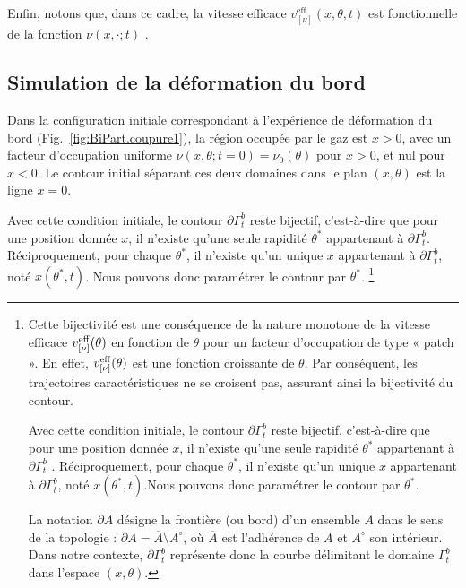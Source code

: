 Enfin, notons que, dans ce cadre, la vitesse efficace $v^{\mathrm{eff}}_{[\nu]}(x,\theta,t)$ est fonctionnelle de la fonction $\nu(x , \cdot ;t )$ . %


\subsection{Simulation de la déformation du bord}


Dans la configuration initiale correspondant à l’expérience de déformation du bord (Fig.~\ref{fig:BiPart.coupure1}), la région occupée par le gaz est $x>0$, avec un facteur d’occupation uniforme \(\nu(x,\theta;t=0)=\nu_0(\theta)\) pour \(x>0\), et nul pour \(x<0\). Le contour initial séparant ces deux domaines dans le plan \((x,\theta)\) est la ligne $x=0$.

\medskip

Avec cette condition initiale, le contour \(\partial\Gamma_t^b\) reste bijectif, c’est-à-dire que pour une position donnée $x$, il n’existe qu’une seule rapidité \(\theta^*\) appartenant à \(\partial\Gamma_t^b\). Réciproquement, pour chaque \(\theta^*\), il n’existe qu’un unique $x$ appartenant à \(\partial\Gamma_t^b\), noté \(x(\theta^*,t)\). 
Nous pouvons donc paramétrer le contour par \(\theta^*\). \footnote{Cette bijectivité est une conséquence de la nature monotone de la vitesse efficace \(v^{\rm eff}_{[\nu]}(\theta)\) en fonction de \(\theta\) pour un facteur d’occupation de type « patch ». En effet, \(v^{\rm eff}_{[\nu]}(\theta)\) est une fonction croissante de \(\theta\). Par conséquent, les trajectoires caractéristiques ne se croisent pas, assurant ainsi la bijectivité du contour.

\smallskip

Avec cette condition initiale, le contour $\partial\Gamma_t^b$ reste bijectif, c’est-à-dire que pour une position donnée $x$, il n’existe qu’une seule rapidité $\theta^*$ appartenant à $\partial\Gamma_t^b$ . Réciproquement, pour chaque $\theta^*$, il n’existe qu’un unique $x$ appartenant à $\partial\Gamma_t^b$, noté $x(\theta^*,t)$.Nous pouvons donc paramétrer le contour par $\theta^*$.

\smallskip

La notation $\partial A$ désigne la frontière (ou bord) d’un ensemble $A$ dans le sens de la topologie : $\partial A = \overline{A} \setminus A^\circ$, où $\overline{A}$ est l’adhérence de $A$ et $A^\circ$ son intérieur. Dans notre contexte, $\partial\Gamma_t^b$ représente donc la courbe délimitant le domaine $\Gamma_t^b$ dans l’espace $(x,\theta)$.
}

